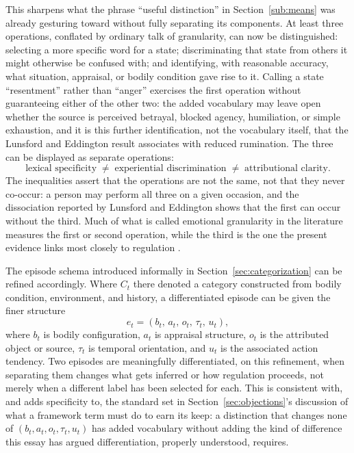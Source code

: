 \documentclass[11pt]{article}
\begin{document}
This sharpens what the phrase ``useful distinction'' in Section~\ref{sub:means} was already gesturing toward without fully separating its components. At least three operations, conflated by ordinary talk of granularity, can now be distinguished: selecting a more specific word for a state; discriminating that state from others it might otherwise be confused with; and identifying, with reasonable accuracy, what situation, appraisal, or bodily condition gave rise to it. Calling a state ``resentment'' rather than ``anger'' exercises the first operation without guaranteeing either of the other two: the added vocabulary may leave open whether the source is perceived betrayal, blocked agency, humiliation, or simple exhaustion, and it is this further identification, not the vocabulary itself, that the Lunsford and Eddington result associates with reduced rumination. The three can be displayed as separate operations:
\[
\text{lexical specificity}
\;\neq\;
\text{experiential discrimination}
\;\neq\;
\text{attributional clarity}.
\]
The inequalities assert that the operations are not the same, not that they never co-occur: a person may perform all three on a given occasion, and the dissociation reported by Lunsford and Eddington shows that the first can occur without the third. Much of what is called emotional granularity in the literature measures the first or second operation, while the third is the one the present evidence links most closely to regulation \citep{LunsfordEddington2026}.

The episode schema introduced informally in Section~\ref{sec:categorization} can be refined accordingly. Where $C_t$ there denoted a category constructed from bodily condition, environment, and history, a differentiated episode can be given the finer structure
\[
e_t = (b_t,\, a_t,\, o_t,\, \tau_t,\, u_t),
\]
where $b_t$ is bodily configuration, $a_t$ is appraisal structure, $o_t$ is the attributed object or source, $\tau_t$ is temporal orientation, and $u_t$ is the associated action tendency. Two episodes are meaningfully differentiated, on this refinement, when separating them changes what gets inferred or how regulation proceeds, not merely when a different label has been selected for each. This is consistent with, and adds specificity to, the standard set in Section~\ref{sec:objections}'s discussion of what a framework term must do to earn its keep: a distinction that changes none of $(b_t, a_t, o_t, \tau_t, u_t)$ has added vocabulary without adding the kind of difference this essay has argued differentiation, properly understood, requires.
\end{document}
